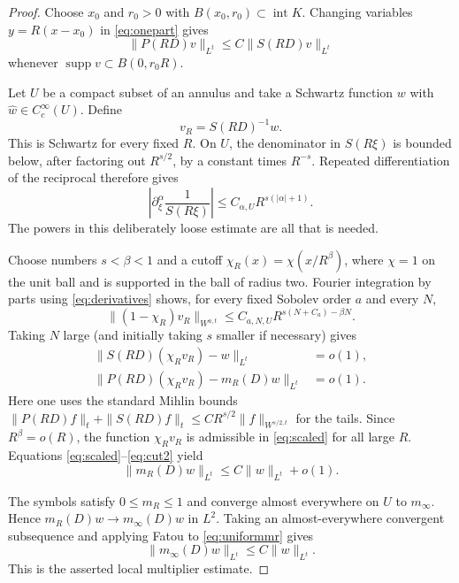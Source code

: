 \documentclass[11pt]{article}
\begin{document}
\begin{proof}
Choose $x_0$ and $r_0>0$ with
$B(x_0,r_0)\subset\operatorname{int}K$.  Changing variables
$y=R(x-x_0)$ in \eqref{eq:onepart} gives
\begin{equation}\label{eq:scaled}
 \|P(RD)v\|_{L^t}\leq C\|S(RD)v\|_{L^t}
\end{equation}
whenever $\operatorname{supp}v\subset B(0,r_0R)$.

Let $U$ be a compact subset of an annulus and take a Schwartz function $w$
with $\widehat w\in C^\infty_c(U)$.  Define
\[
 v_R=S(RD)^{-1}w.
\]
This is Schwartz for every fixed $R$.  On $U$, the denominator in
$S(R\xi)$ is bounded below, after factoring out $R^{s/2}$, by a constant
times $R^{-s}$.  Repeated differentiation of the reciprocal therefore
gives
\begin{equation}\label{eq:derivatives}
 \left|\partial_\xi^\alpha\frac1{S(R\xi)}\right|
 \leq C_{\alpha,U}R^{s(|\alpha|+1)}.
\end{equation}
The powers in this deliberately loose estimate are all that is needed.

Choose numbers $s<\beta<1$ and a cutoff
$\chi_R(x)=\chi(x/R^\beta)$, where $\chi=1$ on the unit ball and is
supported in the ball of radius two.  Fourier integration by parts using
\eqref{eq:derivatives} shows, for every fixed Sobolev order $a$ and every
$N$,
\[
 \|(1-\chi_R)v_R\|_{W^{a,t}}
 \leq C_{a,N,U}R^{s(N+C_a)-\beta N}.
\]
Taking $N$ large (and initially taking $s$ smaller if necessary) gives
\begin{align}
 \|S(RD)(\chi_Rv_R)-w\|_{L^t}&=o(1),\label{eq:cut1}\\
 \|P(RD)(\chi_Rv_R)-m_R(D)w\|_{L^t}&=o(1).\label{eq:cut2}
\end{align}
Here one uses the standard Mihlin bounds
$\|P(RD)f\|_t+\|S(RD)f\|_t\leq C R^{s/2}\|f\|_{W^{s/2,t}}$
for the tails.  Since $R^\beta=o(R)$, the function $\chi_Rv_R$ is
admissible in \eqref{eq:scaled} for all large $R$.  Equations
\eqref{eq:scaled}--\eqref{eq:cut2} yield
\begin{equation}\label{eq:uniformmr}
 \|m_R(D)w\|_{L^t}\leq C\|w\|_{L^t}+o(1).
\end{equation}

The symbols satisfy $0\leq m_R\leq1$ and converge almost everywhere on
$U$ to $m_\infty$.  Hence $m_R(D)w\to m_\infty(D)w$ in $L^2$.
Taking an almost-everywhere convergent subsequence and applying Fatou to
\eqref{eq:uniformmr} gives
\[
 \|m_\infty(D)w\|_{L^t}\leq C\|w\|_{L^t}.
\]
This is the asserted local multiplier estimate.
\end{proof}
\end{document}
